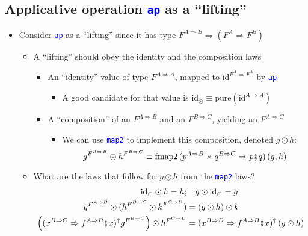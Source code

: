 \subsection{Applicative operation \texttt{\textcolor{blue}{\footnotesize{}ap}}
as a ``lifting''}
\begin{itemize}
\item \vspace{-0.18cm}Consider \texttt{\textcolor{blue}{\footnotesize{}ap}}
as a ``lifting'' since it has type{\footnotesize{} $F^{A\Rightarrow B}\Rightarrow\left(F^{A}\Rightarrow F^{B}\right)$}{\footnotesize\par}
\begin{itemize}
\item A ``lifting'' should obey the identity and the composition laws
\begin{itemize}
\item An ``identity'' value of type $F^{A\Rightarrow A}$, mapped to $\text{id}^{F^{A}\Rightarrow F^{A}}$
by \texttt{\textcolor{blue}{\footnotesize{}ap}} 
\begin{itemize}
\item A good candidate for that value is $\text{id}_{\odot}\equiv\text{pure}\left(\text{id}^{A\Rightarrow A}\right)$
\end{itemize}
\item A ``composition'' of an $F^{A\Rightarrow B}$ and an $F^{B\Rightarrow C}$,
yielding an $F^{A\Rightarrow C}$
\begin{itemize}
\item We can use \texttt{\textcolor{blue}{\footnotesize{}map2}} to implement
this composition, denoted $g\odot h$:
\[
g^{F^{A\Rightarrow B}}\odot h^{F^{B\Rightarrow C}}\equiv\text{fmap2}\,(p^{A\Rightarrow B}\times q^{B\Rightarrow C}\Rightarrow p\bef q)\left(g,h\right)
\]
\end{itemize}
\end{itemize}
\item What are the laws that follow for $g\odot h$ from the \texttt{\textcolor{blue}{\footnotesize{}map2}}
laws?{\footnotesize{}
\begin{align*}
\text{id}_{\odot}\odot h=h; & \quad g\odot\text{id}_{\odot}=g\\
g^{F^{A\Rightarrow B}}\odot(h^{F^{B\Rightarrow C}}\odot k^{F^{C\Rightarrow D}}) & =\left(g\odot h\right)\odot k\\
\left((x^{B\Rightarrow C}\Rightarrow f^{A\Rightarrow B}\bef x)^{\uparrow}g^{F^{B\Rightarrow C}}\right)\odot h^{F^{C\Rightarrow D}} & =(x^{B\Rightarrow D}\Rightarrow f^{A\Rightarrow B}\bef x)^{\uparrow}\left(g\odot h\right)\\

\end{align*}}
\end{itemize}
\end{itemize}
